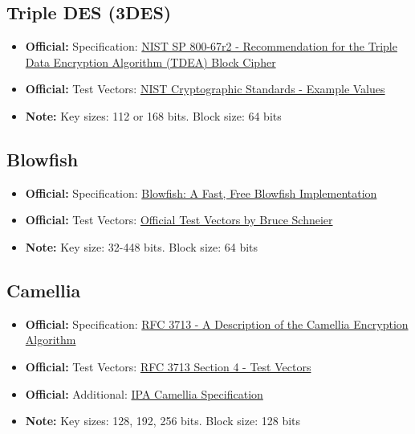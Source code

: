 \documentclass[12pt,a4paper]{article}
\newcommand{\official}[1]{\textcolor{citegreen}{\textbf{Official:}} #1}
\newcommand{\note}[1]{\textcolor{noteorange}{\textbf{Note:}} #1}
\newcommand{\link}[2]{\href{#1}{#2}}
\begin{document}
\subsection{Triple DES (3DES)}
\begin{itemize}
    \item \official{Specification:} \link{https://nvlpubs.nist.gov/nistpubs/SpecialPublications/NIST.SP.800-67r2.pdf}{NIST SP 800-67r2 - Recommendation for the Triple Data Encryption Algorithm (TDEA) Block Cipher}
    \item \official{Test Vectors:} \link{https://csrc.nist.gov/Projects/cryptographic-standards-and-guidelines/example-values}{NIST Cryptographic Standards - Example Values}
    \item \note{Key sizes: 112 or 168 bits. Block size: 64 bits}
\end{itemize}

\subsection{Blowfish}
\begin{itemize}
    \item \official{Specification:} \link{https://www.schneier.com/academic/blowfish/}{Blowfish: A Fast, Free Blowfish Implementation}
    \item \official{Test Vectors:} \link{https://www.schneier.com/code/vectors.txt}{Official Test Vectors by Bruce Schneier}
    \item \note{Key size: 32-448 bits. Block size: 64 bits}
\end{itemize}

\subsection{Camellia}
\begin{itemize}
    \item \official{Specification:} \link{https://tools.ietf.org/html/rfc3713}{RFC 3713 - A Description of the Camellia Encryption Algorithm}
    \item \official{Test Vectors:} \link{https://tools.ietf.org/html/rfc3713#section-4}{RFC 3713 Section 4 - Test Vectors}
    \item \official{Additional:} \link{https://www.ipa.go.jp/security/rfc/RFC3713EN.html}{IPA Camellia Specification}
    \item \note{Key sizes: 128, 192, 256 bits. Block size: 128 bits}
\end{itemize}
\end{document}
